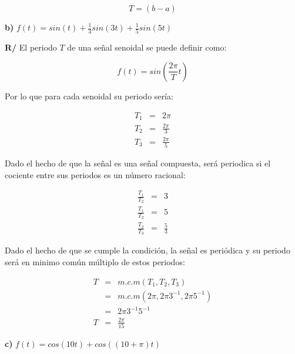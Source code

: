 \documentclass[twocolumn]{article}
\begin{document}
$$T = (b - a)$$

\textbf{b)} $f(t) = sin(t) + \frac{1}{3}sin(3t) + \frac{1}{5}sin(5t)$

\textbf{R/} El periodo $T$ de una señal senoidal se puede definir como:

$$f(t) = sin\left(\frac{2\pi}{T}t\right)$$

Por lo que para cada senoidal su periodo sería:

\begin{eqnarray*}
T_1 &=& 2\pi\\
T_2 &=& \frac{2\pi}{3}\\
T_3 &=& \frac{2\pi}{5}
\end{eqnarray*}

Dado el hecho de que la señal es una señal compuesta, será periodica si el cociente entre sus periodos es un número racional:

\begin{eqnarray*}
\frac{T_1}{T_2} &=& 3\\
\frac{T_1}{T_2} &=& 5\\
\frac{T_2}{T_3} &=& \frac{5}{3}
\end{eqnarray*}

Dado el hecho de que se cumple la condición, la señal es periódica y su periodo será en minimo común múltiplo de estos periodos:

\begin{eqnarray*}
T &=& m.c.m(T_1,T_2,T_3)\\
&=& m.c.m(2 \pi,2\pi3^{-1},2\pi5^{-1})\\
&=& 2\pi3^{-1}5^{-1}\\
T &=& \frac{2\pi}{15}
\end{eqnarray*}

\textbf{c)} $f(t) = cos(10t) + cos((10+\pi)t)$
\end{document}
